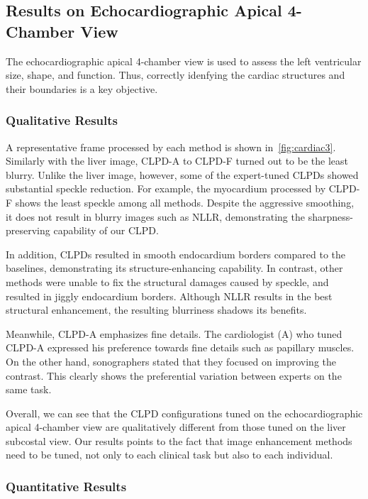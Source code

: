 \subsection{Results on Echocardiographic Apical 4-Chamber View}\label{section:fourchamber}
The echocardiographic apical 4-chamber view is used to assess the left ventricular size, shape, and function.
Thus, correctly idenfying the cardiac structures and their boundaries is a key objective.

\subsubsection{Qualitative Results}
A representative frame processed by each method is shown in~\cref{fig:cardiac3}.
Similarly with the liver image, CLPD-A to CLPD-F turned out to be the least blurry.
Unlike the liver image, however, some of the expert-tuned CLPDs showed substantial speckle reduction.
For example, the myocardium processed by CLPD-F shows the least speckle among all methods.
Despite the aggressive smoothing, it does not result in blurry images such as NLLR, demonstrating the sharpness-preserving capability of our CLPD.

In addition, CLPDs resulted in smooth endocardium borders compared to the baselines, demonstrating its structure-enhancing capability.
In contrast, other methods were unable to fix the structural damages caused by speckle, and resulted in jiggly endocardium borders.
Although NLLR results in the best structural enhancement, the resulting blurriness shadows its benefits.

Meanwhile, CLPD-A emphasizes fine details.
The cardiologist (A) who tuned CLPD-A expressed his preference towards fine details such as papillary muscles.
On the other hand, sonographers stated that they focused on improving the contrast.
This clearly shows the preferential variation between experts on the same task.

Overall, we can see that the CLPD configurations tuned on the echocardiographic apical 4-chamber view are qualitatively different from those tuned on the liver subcostal view.
Our results points to the fact that image enhancement methods need to be tuned, not only to each clinical task but also to each individual.

\subsubsection{Quantitative Results}

